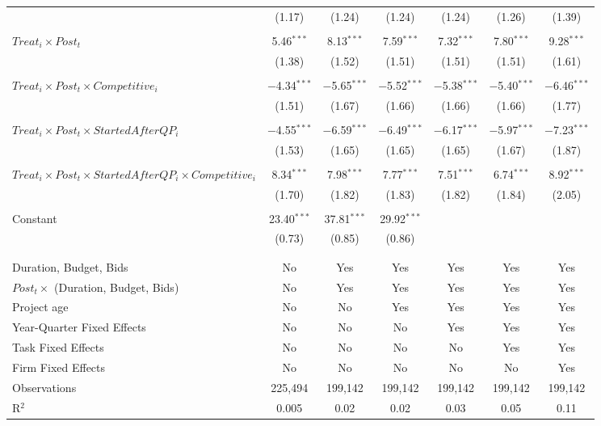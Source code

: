 \documentclass[]{article}
\begin{document}
\begin{table}[H]
\begin{tabular}{@{\extracolsep{-3pt}}lcccccc}
  & (1.17) & (1.24) & (1.24) & (1.24) & (1.26) & (1.39) \\ 
  & & & & & & \\ 
 $Treat_i \times Post_t$ & 5.46$^{***}$ & 8.13$^{***}$ & 7.59$^{***}$ & 7.32$^{***}$ & 7.80$^{***}$ & 9.28$^{***}$ \\ 
  & (1.38) & (1.52) & (1.51) & (1.51) & (1.51) & (1.61) \\ 
  & & & & & & \\ 
 $Treat_i \times Post_t \times Competitive_i$ & $-$4.34$^{***}$ & $-$5.65$^{***}$ & $-$5.52$^{***}$ & $-$5.38$^{***}$ & $-$5.40$^{***}$ & $-$6.46$^{***}$ \\ 
  & (1.51) & (1.67) & (1.66) & (1.66) & (1.66) & (1.77) \\ 
  & & & & & & \\ 
 $Treat_i \times Post_t \times StartedAfterQP_i$ & $-$4.55$^{***}$ & $-$6.59$^{***}$ & $-$6.49$^{***}$ & $-$6.17$^{***}$ & $-$5.97$^{***}$ & $-$7.23$^{***}$ \\ 
  & (1.53) & (1.65) & (1.65) & (1.65) & (1.67) & (1.87) \\ 
  & & & & & & \\ 
 $Treat_i \times Post_t \times StartedAfterQP_i \times Competitive_i$ & 8.34$^{***}$ & 7.98$^{***}$ & 7.77$^{***}$ & 7.51$^{***}$ & 6.74$^{***}$ & 8.92$^{***}$ \\ 
  & (1.70) & (1.82) & (1.83) & (1.82) & (1.84) & (2.05) \\ 
  & & & & & & \\ 
 Constant & 23.40$^{***}$ & 37.81$^{***}$ & 29.92$^{***}$ &  &  &  \\ 
  & (0.73) & (0.85) & (0.86) &  &  &  \\ 
  & & & & & & \\ 
\hline \\[-1.8ex] 
Duration, Budget, Bids & No & Yes & Yes & Yes & Yes & Yes \\ 
$Post_t \times $  (Duration, Budget, Bids) & No & Yes & Yes & Yes & Yes & Yes \\ 
Project age & No & No & Yes & Yes & Yes & Yes \\ 
Year-Quarter Fixed Effects & No & No & No & Yes & Yes & Yes \\ 
Task Fixed Effects & No & No & No & No & Yes & Yes \\ 
Firm Fixed Effects & No & No & No & No & No & Yes \\ 
Observations & 225,494 & 199,142 & 199,142 & 199,142 & 199,142 & 199,142 \\ 
R$^{2}$ & 0.005 & 0.02 & 0.02 & 0.03 & 0.05 & 0.11 \\ 

\end{tabular}
\end{table}
\end{document}
